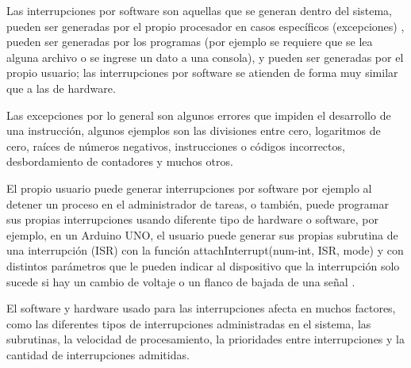 \documentclass[11pt]{article}
\begin{document}
Las interrupciones por software son aquellas que se generan dentro del sistema, pueden ser generadas por el propio procesador en casos específicos (excepciones) , pueden ser generadas por los programas (por ejemplo se requiere que se lea alguna archivo o se ingrese un dato a una consola), y pueden ser generadas por el propio usuario;  las interrupciones por software se atienden de forma muy similar que a las de hardware.

Las excepciones por lo general son algunos errores que impiden el desarrollo de una instrucción, algunos ejemplos son las divisiones entre cero, logaritmos de cero, raíces de números negativos, instrucciones o códigos incorrectos, desbordamiento de contadores y muchos otros.

 El propio usuario puede generar interrupciones por software por ejemplo al detener un proceso en el administrador de tareas, o también, puede programar sus propias interrupciones usando diferente tipo de hardware o software, por ejemplo, en un Arduino UNO, el usuario puede generar sus propias subrutina de una interrupción (ISR) con la función attachInterrupt(num-int, ISR, mode) y con distintos parámetros que le pueden indicar al dispositivo que la interrupción solo sucede si hay un cambio de voltaje o un flanco de bajada de una señal \cite{reyes2015arduino}.
 
 El software y hardware usado para las interrupciones afecta en muchos factores, como las diferentes tipos de interrupciones administradas en el sistema, las subrutinas, la velocidad de procesamiento, la prioridades entre interrupciones y la cantidad de interrupciones admitidas.
\medskip
 
\end{document}

